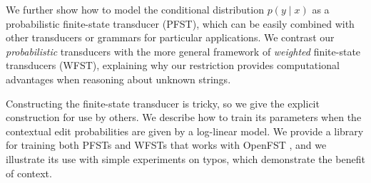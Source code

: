 \documentclass[11pt,letterpaper]{article}
\newcommand{\jason}[1]{\todo[color=blue!40,author=Jason]{#1}}
\begin{document}

We further show how to model the conditional distribution $p(y \mid x)$ as a probabilistic finite-state transducer (PFST), which can be easily combined with other transducers or grammars for particular applications.  We contrast our {\em probabilistic} transducers with the more general framework of {\em weighted} finite-state transducers (WFST), explaining why our restriction provides computational advantages when reasoning about unknown strings.

Constructing the finite-state transducer is tricky, so we give the explicit construction for use by others.  We describe how to train its parameters when the contextual edit probabilities are given by a log-linear model.  We provide a library
for training both PFSTs and WFSTs that works with OpenFST \cite{allauzen2007openfst}, and we illustrate its use with simple experiments on typos, which demonstrate the benefit of context.


\end{document}
